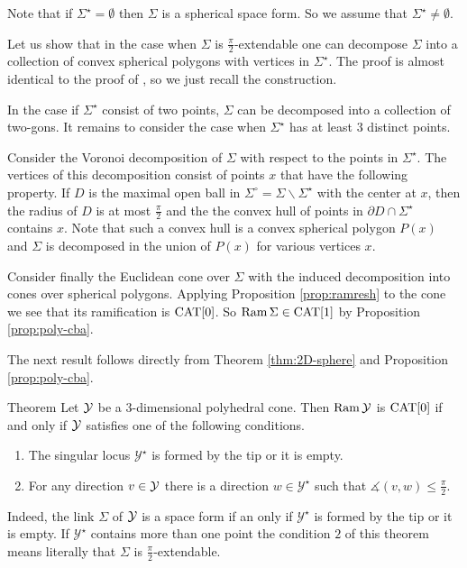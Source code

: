 \documentclass{compositio}
\begin{document}
Note that if $\Sigma^{{\star}}=\emptyset$ then
$\Sigma$ is a spherical space form.
So we assume that $\Sigma^{{\star}}\ne\emptyset$.

Let us show that in the case when $\Sigma$ is $\frac{\pi}{2}$-extendable one can
decompose $\Sigma$ into a collection of convex spherical
polygons with vertices in $\Sigma^{{\star}}$.
The proof is almost identical to the
proof of \cite[Proposition 3.1]{thurston},
so we just recall the construction.

In the case if $\Sigma^{{\star}}$ consist of two points,
$\Sigma$ can be decomposed into a collection of two-gons.
It remains to consider the case when $\Sigma^{{\star}}$ has at least 3 distinct points.

Consider the Voronoi decomposition of $\Sigma$ with respect to the points in $\Sigma^{{\star}}$.
The vertices of this decomposition
consist of points $x$ that have the following property.
If $D$ is the maximal open ball in $\Sigma^\circ=\Sigma\backslash \Sigma^{{\star}}$
with the center at $x$, then the radius of $D$ is at most $\tfrac\pi2$ and the  the convex hull of points in  $\partial D\cap \Sigma^{{\star}}$
contains $x$.
Note that such a convex hull is a convex spherical polygon $P(x)$ and $\Sigma$ is decomposed
in the union of $P(x)$ for various vertices $x$.

Consider finally the Euclidean cone over $\Sigma$ with the induced decomposition
into cones over spherical polygons. Applying Proposition \ref{prop:ramresh} to the cone we
see that its ramification is $\mathrm{CAT}[0]$. So $\mathop{\rm Ram}\nolimits\Sigma\in \mathrm{CAT}[1]$ by Proposition \ref{prop:poly-cba}.
\qeds

The next result follows directly from Theorem \ref{thm:2D-sphere} and Proposition \ref{prop:poly-cba}.

\begin{thm}{Theorem}\label{3cone}
Let $\mathcal{Y}$ be a 3-dimensional polyhedral cone.
Then $\mathop{\rm Ram}\nolimits \mathcal{Y}$ is $\mathrm{CAT}[0]$
if and only if
$\mathcal{Y}$ satisfies one of the following conditions.
\begin{enumerate}
\item The singular locus $\mathcal{Y}^\star$ is formed by the tip or it is empty.
\item For any direction $v\in\mathcal{Y}$ there is a direction $w\in\mathcal{Y}^\star$ such that $\measuredangle(v,w)\le \tfrac\pi2$.
\end{enumerate}
\end{thm}
Indeed, the link $\Sigma$ of $\mathcal{Y}$ is a space form if an only if
$\mathcal{Y}^\star$ is formed by the tip or it is empty.
If $\mathcal{Y}^\star$ contains more than one point
the condition $2$ of this theorem means literally that $\Sigma$ is $\frac{\pi}{2}$-extendable.
\end{document}
